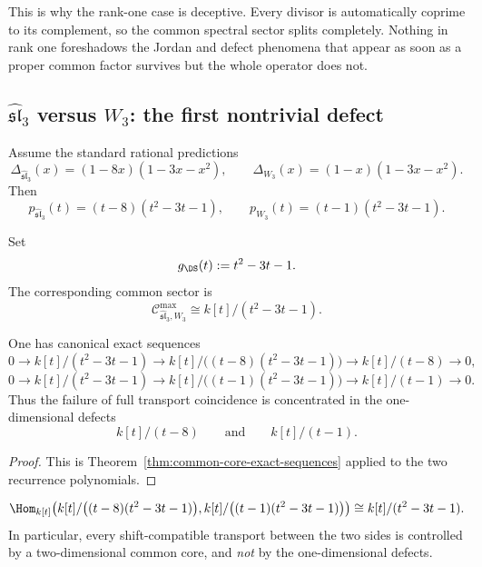 \begin{remark}
This is why the rank-one case is deceptive.
Every divisor is automatically coprime to its complement, so the common spectral sector splits completely.
Nothing in rank one foreshadows the Jordan and defect phenomena that appear as soon as a proper common factor survives but the whole operator does not.
\end{remark}

\subsection{\(\widehat{\mathfrak{sl}}_3\) versus \(W_3\): the first nontrivial defect}

Assume the standard rational predictions
\[
\Delta_{\widehat{\mathfrak{sl}}_3}(x)=(1-8x)(1-3x-x^2),
\qquad
\Delta_{W_3}(x)=(1-x)(1-3x-x^2).
\]
Then
\[
p_{\widehat{\mathfrak{sl}}_3}(t)=(t-8)(t^2-3t-1),
\qquad
p_{W_3}(t)=(t-1)(t^2-3t-1).
\]

\begin{definition}
Set
\[
g_{\DS}(t):=t^2-3t-1.
\]
The corresponding common sector is
\[
\mathcal C^{\max}_{\widehat{\mathfrak{sl}}_3,W_3}
\cong k[t]/(t^2-3t-1).
\]
\end{definition}

\begin{proposition}
\ClaimStatusProvedHere
\label{prop:sl3-w3-defect}
One has canonical exact sequences
\[
0\longrightarrow k[t]/(t^2-3t-1)\longrightarrow
k[t]/\bigl((t-8)(t^2-3t-1)\bigr)\longrightarrow k[t]/(t-8)\longrightarrow 0,
\]
\[
0\longrightarrow k[t]/(t^2-3t-1)\longrightarrow
k[t]/\bigl((t-1)(t^2-3t-1)\bigr)\longrightarrow k[t]/(t-1)\longrightarrow 0.
\]
Thus the failure of full transport coincidence is concentrated in the one-dimensional defects
\[
k[t]/(t-8)
\qquad\text{and}\qquad
k[t]/(t-1).
\]
\end{proposition}

\begin{proof}
This is Theorem~\ref{thm:common-core-exact-sequences} applied to the two recurrence polynomials.
\end{proof}

\begin{corollary}
\ClaimStatusProvedHere
\[
\Hom_{k[t]}\!\left(
k[t]/\bigl((t-8)(t^2-3t-1)\bigr),
k[t]/\bigl((t-1)(t^2-3t-1)\bigr)
\right)
\cong
k[t]/(t^2-3t-1).
\]
In particular, every shift-compatible transport between the two sides is controlled by a two-dimensional common core, and \emph{not} by the one-dimensional defects.
\end{corollary}

